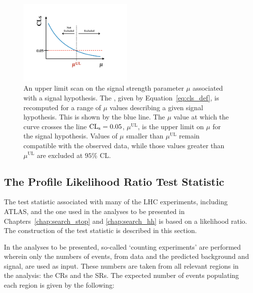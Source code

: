 \begin{figure}[!htb]
    \begin{center}
        \includegraphics[width=0.5\textwidth]{figures/common_ana/stat_hypo/upper_limit_scan_examplePDF}
        \caption{
            An upper limit scan on the signal strength parameter $\mu$ associated with a signal hypothesis.
            The \cls, given by Equation~\ref{eq:cls_def}, is recomputed for a range of $\mu$ values
            describing a given signal hypothesis.
            This is shown by the blue line.
            The $\mu$ value at which the \cls curve crosses the line $\text{CL}_{\text{s}} = 0.05$, $\mu^{\text{UL}}$, is the
            upper limit on $\mu$ for the signal hypothesis.
            Values of $\mu$ smaller than $\mu^{\text{UL}}$ remain compatible with the observed data,
            while those values greater than $\mu^{\text{UL}}$ are excluded at $95\%$ CL.
        }
        \label{fig:upper_limit_scan_cartoon}
    \end{center}
\end{figure}

%
%

\subsection{The Profile Likelihood Ratio Test Statistic}
\label{sec:likelihood}

The test statistic associated with many of the LHC experiments, including ATLAS,
and the one used in the analyses to be presented in Chapters~\ref{chap:search_stop} and
\ref{chap:search_hh} is based on a likelihood ratio.
The construction of the test statistic is described in this section.

In the analyses to be presented, so-called `counting experiments' are performed wherein
only the numbers of events, from data and the predicted background and signal,
are used as input.
These numbers are taken from all relevant regions in the analysis: the CRs and the SRs.
The expected number of events populating each region is given by the following:

